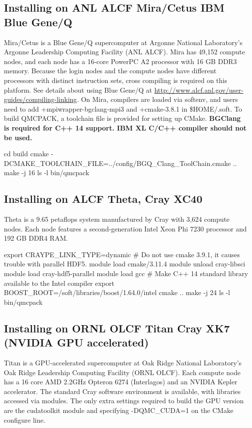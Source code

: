 \subsection{Installing on ANL ALCF Mira/Cetus IBM Blue Gene/Q}
\label{sec:buildbgq}
Mira/Cetus is a Blue Gene/Q supercomputer at Argonne National Laboratory's Argonne Leadership Computing Facility (ANL ALCF).
Mira has 49,152 compute nodes, and each node has a 16-core PowerPC A2 processor with 16 GB DDR3 memory.
Because the login nodes and the compute nodes have different processors with distinct instruction sets,
cross compiling is required on this platform. See details about using Blue Gene/Q at \url{http://www.alcf.anl.gov/user-guides/compiling-linking}.
On Mira, compilers are loaded via softenv, and users need to add +mpiwrapper-bgclang-mpi3 and +cmake-3.8.1 in \$HOME/.soft.
To build QMCPACK, a toolchain file is provided for setting up CMake.
\textbf{BGClang is required for C++ 14 support. IBM XL C/C++ compiler should not be used.}

%
\begin{shade}
cd build
cmake -DCMAKE_TOOLCHAIN_FILE=../config/BGQ_Clang_ToolChain.cmake ..
make -j 16
ls -l bin/qmcpack
\end{shade}

\subsection{Installing on ALCF Theta, Cray XC40}
Theta is a 9.65 petaflops system manufactured by Cray with 3,624 compute nodes.
Each node features a second-generation Intel Xeon Phi 7230 processor and 192 GB DDR4 RAM.

%
\begin{shade}
export CRAYPE_LINK_TYPE=dynamic
# Do not use cmake 3.9.1, it causes trouble with parallel HDF5.
module load cmake/3.11.4
module unload cray-libsci
module load cray-hdf5-parallel
module load gcc   # Make C++ 14 standard library available to the Intel compiler
export BOOST_ROOT=/soft/libraries/boost/1.64.0/intel
cmake ..
make -j 24
ls -l bin/qmcpack
\end{shade}

\subsection{Installing on ORNL OLCF Titan Cray XK7 (NVIDIA GPU
  accelerated)}
\label{sec:titanbuildgpu}
Titan is a GPU-accelerated supercomputer at Oak Ridge National
Laboratory's  Oak Ridge Leadership Computing Facility  (ORNL OLCF). Each
compute node has a 16 core AMD 2.2GHz Opteron 6274 (Interlagos) and an
NVIDIA Kepler accelerator. The standard Cray software environment is
available, with libraries accessed via modules. The only extra
settings required to build the GPU version are the cudatoolkit module
and specifying -DQMC\_CUDA=1 on the CMake configure line.

